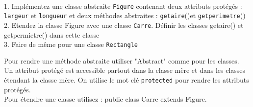 \begin{Exercice}[10 minutes]\\
1. Implémentez une classe abstraite \lstinline{Figure} contenant deux attributs protégés : \lstinline{largeur} et \lstinline{longueur} et deux méthodes abstraites : \lstinline{getaire}()et \lstinline{getperimetre}()\\
2. Etendez la classe Figure avec une classe \lstinline{Carre}. Définir les classes getaire() et getpermietre() dans cette classe\\
3. Faire de même pour une classe \lstinline{Rectangle}\\

\begin{conseil}
    Pour rendre une méthode abstraite utiliser "Abstract" comme pour les classes.\\
    Un attribut protégé est accessible partout dans la classe mère et dans les classes étendant la classe mère. On utilise le mot clé \lstinline{protected} pour rendre les attributs protégés. \\
    Pour étendre une classe utilisez : public class Carre extends Figure. 
\end{conseil}


\begin{solution}
 
\end{solution}
\end{Exercice}

